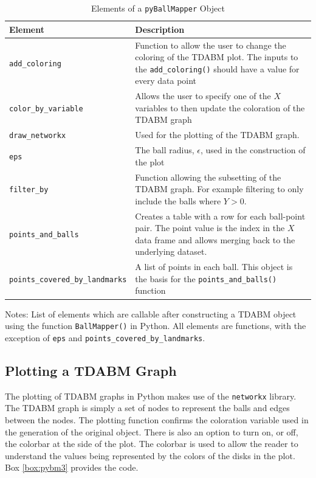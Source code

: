 \documentclass{article}
\begin{document}
\begin{table}
	\begin{center}
		\caption{Elements of a \texttt{pyBallMapper} Object}
		\label{tab:bmo1}
		\begin{tabular}{|l| p{10cm}|}
			\hline
			Element & Description \\
			\hline
			\texttt{add\_coloring} & Function to allow the user to change the coloring of the TDABM plot. The inputs to the \texttt{add\_coloring()} should have a value for every data point \\ 
			\hline
			\texttt{color\_by\_variable}& Allows the user to specify one of the $X$ variables to then update the coloration of the TDABM graph\\
			\hline
			\texttt{draw\_networkx}&Used for the plotting of the TDABM graph.\\
			\hline
			\texttt{eps} & The ball radius, $\epsilon$, used in the construction of the plot\\
			\hline
			\texttt{filter\_by}& Function allowing the subsetting of the TDABM graph. For example filtering to only include the balls where $Y>0$.\\
			\hline
			\texttt{points\_and\_balls}& Creates a table with a row for each ball-point pair. The point value is the index in the $X$ data frame and allows merging back to the underlying dataset.\\
			\hline
			\texttt{points\_covered\_by\_landmarks}&A list of points in each ball. This object is the basis for the \texttt{points\_and\_balls()} function \\
			\hline
		\end{tabular}
	\end{center}
	\raggedright
	\footnotesize{Notes: List of elements which are callable after constructing a TDABM object using the function \texttt{BallMapper()} in Python. All elements are functions, with the exception of \texttt{eps} and \texttt{points\_covered\_by\_landmarks}.}
\end{table}

\subsection{Plotting a TDABM Graph}

The plotting of TDABM graphs in Python makes use of the \texttt{networkx} library. The TDABM graph is simply a set of nodes to represent the balls and edges between the nodes. The plotting function confirms the coloration variable used in the generation of the original object. There is also an option to turn on, or off, the colorbar at the side of the plot. The colorbar is used to allow the reader to understand the values being represented by the colors of the disks in the plot. Box \ref{box:pybm3} provides the code.
\end{document}
